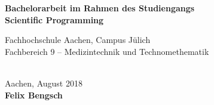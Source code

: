 \begin{titlepage}
	
	\parindent0pt
	
	
	\centering
	\textbf{
		\large{
			Bachelorarbeit im Rahmen des Studiengangs\\
			Scientific Programming\\[25mm]
		}
	}
	
	\large{
		Fachhochschule Aachen, Campus Jülich\\
		Fachbereich 9 -- Medizintechnik und Technomethematik\\[50mm]
	}
	
	\textbf{
		\LARGE{
			\getTitle{}
		}
	}\\[80mm]
	
	Aachen, August 2018\\[10mm]
	\textbf{Felix Bengsch}
\end{titlepage}
